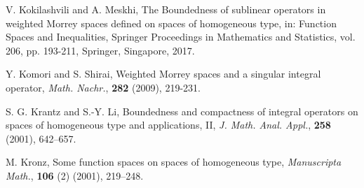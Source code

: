 \documentclass[11pt,a4paper]{amsart}
\numberwithin{equation}{section}
\begin{document}
{\begin{thebibliography}{10}

%
%
%

 V. Kokilashvili and A. Meskhi, The Boundedness of sublinear operators in
weighted Morrey spaces defined on spaces of homogeneous type, in:  Function Spaces and Inequalities, Springer Proceedings in Mathematics and Statistics, vol. 206, pp. 193-211, Springer, Singapore, 2017.


 Y. Komori and S. Shirai, Weighted Morrey spaces and a singular integral operator, {\it Math. Nachr.},  {\bf 282} (2009), 219-231.




%





S. G. Krantz and S.-Y. Li, Boundedness and compactness of integral operators on spaces of homogeneous type and applications, I\!I, {\it J. Math. Anal. Appl.}, {\bf258} (2001), 642--657.


  {\sc M. Kronz}, Some function spaces on spaces of homogeneous type, {\it Manuscripta Math.}, {\bf 106} (2) (2001), 219--248.





\end{thebibliography}}
\end{document}
